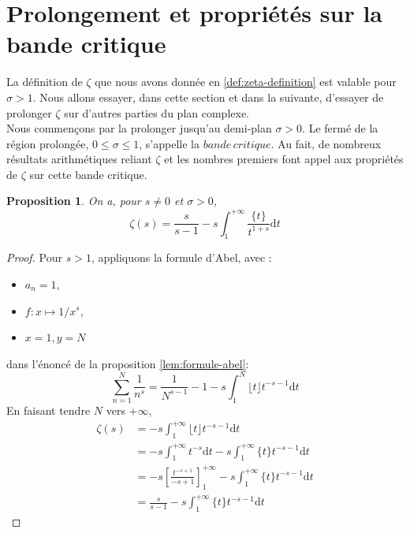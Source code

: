 \documentclass[french]{report}
\newtheorem{proposition}[theorem]{Proposition}
\begin{document}
\section{Prolongement et propriétés sur la bande critique}\label{section:prolongement-proprietes-bande-critique}

La définition de $\zeta$ que nous avons donnée en \ref{def:zeta-definition} est valable pour $\sigma>1$. Nous allons essayer, dans cette section et dans la suivante, d'essayer de prolonger $\zeta$ sur d'autres parties du plan complexe. \\

Nous commençons par la prolonger jusqu'au demi-plan $\sigma>0$. Le fermé de la région prolongée, $0\leq\sigma\leq1$, s'appelle la $bande\,critique$. Au fait, de nombreux résultats arithmétiques reliant $\zeta$ et les nombres premiers font appel aux propriétés de $\zeta$ sur cette bande critique.

\begin{proposition} On a, pour $s\neq0$ et $\sigma>0$,
  \[ \zeta(s) = \frac{s}{s-1}-s\int_1^{+\infty}\frac{\{t\}}{t^{1+s}}\mathrm{d}t \]
\end{proposition}

\begin{proof}
  Pour $s>1$, appliquons la formule d'Abel, avec :
  \begin{itemize}
    \item $a_n=1$,
    \item $f:x\mapsto 1/x^s$,
    \item $x=1, y=N$
  \end{itemize}
  dans l'énoncé de la proposition \ref{lem:formule-abel}:
  \[
    \sum_{n=1}^N\frac{1}{n^s}
    = \frac{1}{N^{s-1}} - 1 - s\int_1^N\lfloor t\rfloor t^{-s-1}\mathrm{d}t
  \]
  En faisant tendre $N$ vers $+\infty$,
  \begin{align*}
    \zeta(s)
    &= - s\int_1^{+\infty}\lfloor t\rfloor t^{-s-1}\mathrm{d}t \\
    &= - s\int_1^{+\infty} t^{-s}\mathrm{d}t - s\int_1^{+\infty} \{t\}t^{-s-1}\mathrm{d}t \\
    &= -s\left[\frac{t^{-s+1}}{-s+1}\right]_1^{+\infty} - s\int_1^{+\infty} \{t\}t^{-s-1}\mathrm{d}t \\
    &= \frac{s}{s-1} - s\int_1^{+\infty} \{t\}t^{-s-1}\mathrm{d}t
  \end{align*}
\end{proof}
\end{document}
